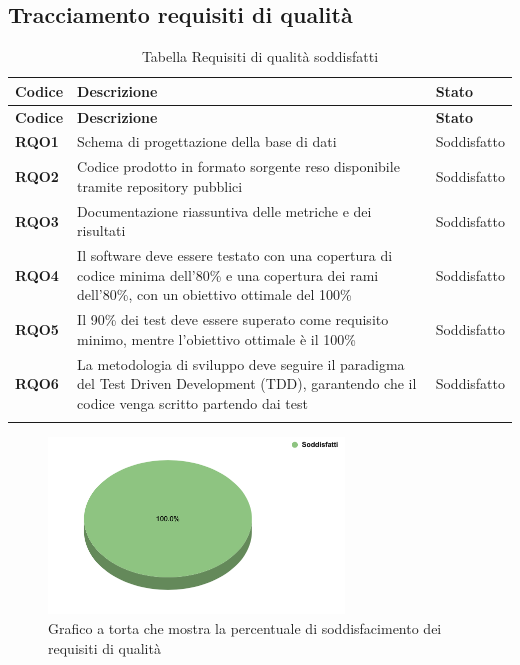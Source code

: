 \newpage
\subsection{Tracciamento requisiti di qualità}

\begin{longtable}{|>{\centering\arraybackslash}m{}|>{\centering\arraybackslash}m{}|>{\centering\arraybackslash}m{}|}
	\hline
	\textbf{Codice} & \textbf{Descrizione} & \textbf{Stato}\\\hline
	\endfirsthead
	\hline
	\textbf{Codice} & \textbf{Descrizione} & \textbf{Stato}\\\hline
	\endhead
	\hline
    \textbf{RQO1} & Schema di progettazione della base di dati & Soddisfatto \\
    \hline
    \textbf{RQO2} & Codice prodotto in formato sorgente reso disponibile tramite repository pubblici & Soddisfatto \\
    \hline
    \textbf{RQO3} & Documentazione riassuntiva delle metriche e dei risultati & Soddisfatto \\
    \hline
    \textbf{RQO4} & Il software deve essere testato con una copertura di codice minima dell'80\% e una copertura dei rami dell'80\%, con un obiettivo ottimale del 100\% & Soddisfatto \\
    \hline
    \textbf{RQO5} & Il 90\% dei test deve essere superato come requisito minimo, mentre l'obiettivo ottimale è il 100\% & Soddisfatto \\
    \hline
    \textbf{RQO6} & La metodologia di sviluppo deve seguire il paradigma del Test Driven Development (TDD), garantendo che il codice venga scritto partendo dai test & Soddisfatto \\
    \hline

\caption{Tabella Requisiti di qualità soddisfatti}
\end{longtable}

\begin{figure}[H]
    \centering
    \includegraphics[width=0.7\textwidth]{img/RequisitiQualita.png}
    \caption{Grafico a torta che mostra la percentuale di soddisfacimento dei requisiti di qualità}
\end{figure}
\newpage

